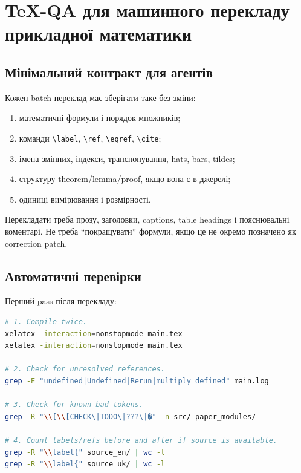 \chapter{TeX-QA для машинного перекладу прикладної математики}
\label{ch:tex-qa-machine-translation}

\section{Мінімальний контракт для агентів}

Кожен batch-переклад має зберігати таке без зміни:

\begin{enumerate}[label=\arabic*.]
\item математичні формули і порядок множників;
\item команди \verb|\label|, \verb|\ref|, \verb|\eqref|, \verb|\cite|;
\item імена змінних, індекси, транспонування, hats, bars, tildes;
\item структуру theorem/lemma/proof, якщо вона є в джерелі;
\item одиниці вимірювання і розмірності.
\end{enumerate}

Перекладати треба прозу, заголовки, captions, table headings і пояснювальні коментарі. Не треба ``покращувати'' формули, якщо це не окремо позначено як correction patch.

\section{Автоматичні перевірки}

Перший pass після перекладу:
\begin{lstlisting}[language=bash]
# 1. Compile twice.
xelatex -interaction=nonstopmode main.tex
xelatex -interaction=nonstopmode main.tex

# 2. Check for unresolved references.
grep -E "undefined|Undefined|Rerun|multiply defined" main.log

# 3. Check for known bad tokens.
grep -R "\\[\\[CHECK\|TODO\|???\|�" -n src/ paper_modules/

# 4. Count labels/refs before and after if source is available.
grep -R "\\label{" source_en/ | wc -l
grep -R "\\label{" source_uk/ | wc -l
\end{lstlisting}

